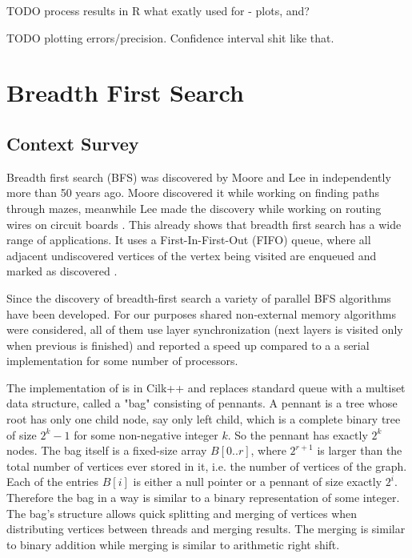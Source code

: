 \documentclass{report}
\theoremstyle{plain}
\theoremstyle{definition}
\theoremstyle{remark}
\begin{document}
TODO process results in R what exatly used for - plots, and?

TODO plotting errors/precision. Confidence interval shit like that.

\chapter{Breadth First Search}

\section{Context Survey}

Breadth first search (BFS) was discovered by Moore and Lee in independently more than 50 years ago. Moore discovered it while working on finding paths through mazes, meanwhile Lee made the discovery while working on routing wires on circuit boards \cite{cormen2001introduction}. This already shows that breadth first search has a wide range of applications. It uses a First-In-First-Out (FIFO) queue, where all adjacent undiscovered vertices of the vertex being visited are enqueued and marked as discovered \cite{c++_sedgewick}.

Since the discovery of breadth-first search a variety of parallel BFS algorithms have been developed. For our purposes shared non-external memory algorithms \cite{Leiserson, bader2006designing, cong2008solving, zhang2006parallel} were considered, all of them use layer synchronization (next layers is visited only when previous is finished) and reported a speed up compared to a a serial implementation for some number of processors.

The implementation of \cite{Leiserson} is in Cilk++ and replaces standard queue with a multiset data structure, called a "bag" consisting of pennants. A pennant is a tree whose root has only one child node, say only left child, which is a complete binary tree of size $2^k-1$ for some non-negative integer $k$. So the pennant has exactly $2^k$ nodes. The bag itself is a fixed-size array $B[0..r]$, where $2^{r+1}$ is larger than the total number of vertices ever stored in it, i.e. the number of vertices of the graph. Each of the entries $B[i]$ is either a null pointer or a pennant of size exactly $2^i$. Therefore the bag in a way is similar to a binary representation of some integer. The bag's structure allows quick splitting and merging of vertices when distributing vertices between threads and merging results. The merging is similar to binary addition while merging is similar to arithmetic right shift.
\end{document}
